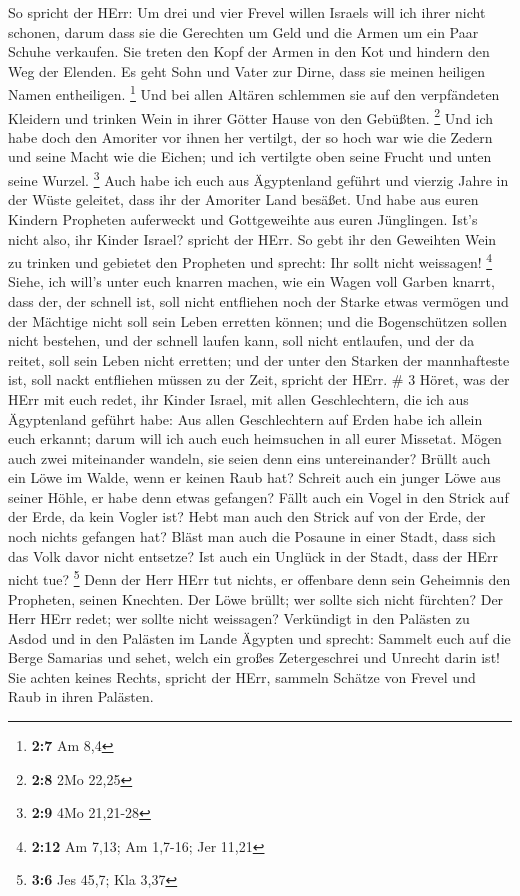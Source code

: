  So spricht der HErr: Um drei und vier Frevel willen Israels
will ich ihrer nicht schonen, darum dass sie die Gerechten um Geld und
die Armen um ein Paar Schuhe verkaufen.  Sie treten den Kopf
der Armen in den Kot und hindern den Weg der Elenden. Es geht Sohn und
Vater zur Dirne, dass sie meinen heiligen Namen entheiligen. \footnote{\textbf{2:7}
  Am 8,4}  Und bei allen Altären schlemmen sie auf den
verpfändeten Kleidern und trinken Wein in ihrer Götter Hause von den
Gebüßten. \footnote{\textbf{2:8} 2Mo 22,25}  Und ich habe
doch den Amoriter vor ihnen her vertilgt, der so hoch war wie die Zedern
und seine Macht wie die Eichen; und ich vertilgte oben seine Frucht und
unten seine Wurzel. \footnote{\textbf{2:9} 4Mo 21,21-28} 
Auch habe ich euch aus Ägyptenland geführt und vierzig Jahre in der
Wüste geleitet, dass ihr der Amoriter Land besäßet.  Und
habe aus euren Kindern Propheten auferweckt und Gottgeweihte aus euren
Jünglingen. Ist's nicht also, ihr Kinder Israel? spricht der HErr.
 So gebt ihr den Geweihten Wein zu trinken und gebietet den
Propheten und sprecht: Ihr sollt nicht weissagen! \footnote{\textbf{2:12}
  Am 7,13; Am 1,7-16; Jer 11,21}  Siehe, ich will's unter
euch knarren machen, wie ein Wagen voll Garben knarrt, 
dass der, der schnell ist, soll nicht entfliehen noch der Starke etwas
vermögen und der Mächtige nicht soll sein Leben erretten können;
 und die Bogenschützen sollen nicht bestehen, und der
schnell laufen kann, soll nicht entlaufen, und der da reitet, soll sein
Leben nicht erretten;  und der unter den Starken der
mannhafteste ist, soll nackt entfliehen müssen zu der Zeit, spricht der
HErr. \# 3  Höret, was der HErr mit euch redet, ihr Kinder
Israel, mit allen Geschlechtern, die ich aus Ägyptenland geführt habe:
 Aus allen Geschlechtern auf Erden habe ich allein euch
erkannt; darum will ich auch euch heimsuchen in all eurer Missetat.
 Mögen auch zwei miteinander wandeln, sie seien denn eins
untereinander?  Brüllt auch ein Löwe im Walde, wenn er
keinen Raub hat? Schreit auch ein junger Löwe aus seiner Höhle, er habe
denn etwas gefangen?  Fällt auch ein Vogel in den Strick auf
der Erde, da kein Vogler ist? Hebt man auch den Strick auf von der Erde,
der noch nichts gefangen hat?  Bläst man auch die Posaune in
einer Stadt, dass sich das Volk davor nicht entsetze? Ist auch ein
Unglück in der Stadt, dass der HErr nicht tue? \footnote{\textbf{3:6}
  Jes 45,7; Kla 3,37}  Denn der Herr HErr tut nichts, er
offenbare denn sein Geheimnis den Propheten, seinen Knechten.
 Der Löwe brüllt; wer sollte sich nicht fürchten? Der Herr
HErr redet; wer sollte nicht weissagen?  Verkündigt in den
Palästen zu Asdod und in den Palästen im Lande Ägypten und sprecht:
Sammelt euch auf die Berge Samarias und sehet, welch ein großes
Zetergeschrei und Unrecht darin ist!  Sie achten keines
Rechts, spricht der HErr, sammeln Schätze von Frevel und Raub in ihren
Palästen.

